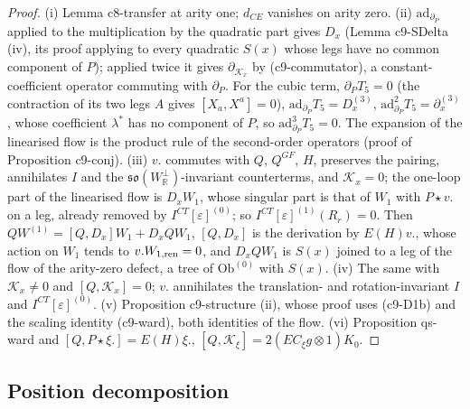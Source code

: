 \documentclass[11pt]{article}
\numberwithin{equation}{section}
\theoremstyle{plain}
\theoremstyle{definition}
\newcommand{\Ob}{\mathrm{Ob}}
\newcommand{\ICT}{I^{CT}[\varepsilon]}
\begin{document}
\begin{proof}
(i) Lemma c8-transfer at arity one; $d_{CE}$ vanishes on arity zero. (ii) $\mathrm{ad}_{\partial_P}$ applied to the multiplication by the quadratic part gives $D_x$ (Lemma c9-SDelta (iv), its proof applying to every quadratic $S(x)$ whose legs have no common component of $P$); applied twice it gives $\partial_{\mathcal K_x}$ by (c9-commutator), a constant-coefficient operator commuting with $\partial_P$. For the cubic term, $\partial_PT_5=0$ (the contraction of its two legs $A$ gives $[X_a,X^a]=0$), $\mathrm{ad}_{\partial_P}T_5=D^{(3)}_x$, $\mathrm{ad}^2_{\partial_P}T_5=\partial^{(3)}_x$, whose coefficient $\lambda^*$ has no component of $P$, so $\mathrm{ad}^3_{\partial_P}T_5=0$. The expansion of the linearised flow is the product rule of the second-order operators (proof of Proposition c9-conj). (iii) $v.$ commutes with $Q$, $Q^{GF}$, $H$, preserves the pairing, annihilates $I$ and the $\mathfrak{so}(W^\perp_{\mathbb R})$-invariant counterterms, and $\mathcal K_x=0$; the one-loop part of the linearised flow is $D_xW_1$, whose singular part is that of $W_1$ with $P\star v.$ on a leg, already removed by $\ICT^{(0)}$; so $\ICT^{(1)}(R_r)=0$. Then $QW^{(1)}=[Q,D_x]W_1+D_xQW_1$, $[Q,D_x]$ is the derivation by $E(H)v.$, whose action on $W_1$ tends to $v.W_{1,{\rm ren}}=0$, and $D_xQW_1$ is $S(x)$ joined to a leg of the flow of the arity-zero defect, a tree of $\Ob^{(0)}$ with $S(x)$. (iv) The same with $\mathcal K_x\ne0$ and $[Q,\mathcal K_x]=0$; $v.$ annihilates the translation- and rotation-invariant $I$ and $\ICT^{(0)}$. (v) Proposition c9-structure (ii), whose proof uses (c9-D1b) and the scaling identity (c9-ward), both identities of the flow. (vi) Proposition qs-ward and $[Q,P\star\xi.]=E(H)\xi.$, $[Q,\mathcal K_\xi]=2(E C_\xi g\otimes1)K_0$.
\end{proof}

\subsection{Position decomposition}
\end{document}
